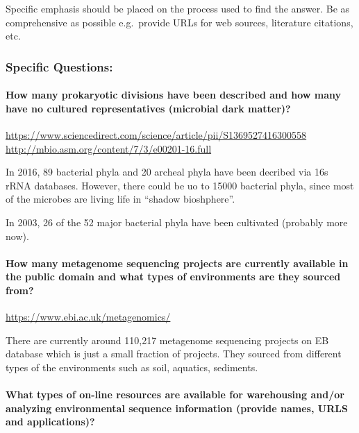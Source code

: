 \documentclass[]{article}
\let\oldparagraph\paragraph
\renewcommand{\paragraph}[1]{\oldparagraph{#1}\mbox{}}
\begin{document}
Specific emphasis should be placed on the process used to find the
answer. Be as comprehensive as possible e.g.~provide URLs for web
sources, literature citations, etc.

\subsubsection{Specific Questions:}\label{specific-questions-4}

\paragraph{How many prokaryotic divisions have been described and how
many have no cultured representatives (microbial dark
matter)?}\label{how-many-prokaryotic-divisions-have-been-described-and-how-many-have-no-cultured-representatives-microbial-dark-matter}

\url{https://www.sciencedirect.com/science/article/pii/S1369527416300558}
\url{http://mbio.asm.org/content/7/3/e00201-16.full}

In 2016, 89 bacterial phyla and 20 archeal phyla have been decribed via
16s rRNA databases. However, there could be uo to 15000 bacterial phyla,
since most of the microbes are living life in ``shadow bioshphere''.

In 2003, 26 of the 52 major bacterial phyla have been cultivated
(probably more now).

\paragraph{How many metagenome sequencing projects are currently
available in the public domain and what types of environments are they
sourced
from?}\label{how-many-metagenome-sequencing-projects-are-currently-available-in-the-public-domain-and-what-types-of-environments-are-they-sourced-from}

\url{https://www.ebi.ac.uk/metagenomics/}

There are currently around 110,217 metagenome sequencing projects on EB
database which is just a small fraction of projects. They sourced from
different types of the environments such as soil, aquatics, sediments.

\paragraph{What types of on-line resources are available for warehousing
and/or analyzing environmental sequence information (provide names, URLS
and
applications)?}\label{what-types-of-on-line-resources-are-available-for-warehousing-andor-analyzing-environmental-sequence-information-provide-names-urls-and-applications}
\end{document}
